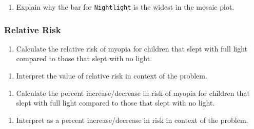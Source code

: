\documentclass[
]{report}
\providecommand{\tightlist}{%
  \setlength{\itemsep}{0pt}\setlength{\parskip}{0pt}}
\begin{document}
\vspace{1in}

\begin{enumerate}
\def\labelenumi{\arabic{enumi}.}
\setcounter{enumi}{12}
\tightlist
\item
  Explain why the bar for \texttt{Nightlight} is the widest in the mosaic plot.
\end{enumerate}

\vspace{0.8in}

\subsubsection*{Relative Risk}\label{relative-risk}

\begin{enumerate}
\def\labelenumi{\arabic{enumi}.}
\setcounter{enumi}{13}
\tightlist
\item
  Calculate the relative risk of myopia for children that slept with full light compared to those that slept with no light.
\end{enumerate}

\vspace{0.8in}

\begin{enumerate}
\def\labelenumi{\arabic{enumi}.}
\setcounter{enumi}{14}
\tightlist
\item
  Interpret the value of relative risk in context of the problem.
\end{enumerate}

\vspace{1in}

\begin{enumerate}
\def\labelenumi{\arabic{enumi}.}
\setcounter{enumi}{15}
\tightlist
\item
  Calculate the percent increase/decrease in risk of myopia for children that slept with full light compared to those that slept with no light.
\end{enumerate}

\vspace{0.8in}

\begin{enumerate}
\def\labelenumi{\arabic{enumi}.}
\setcounter{enumi}{16}
\tightlist
\item
  Interpret as a percent increase/decrease in risk in context of the problem.
\end{enumerate}
\end{document}
